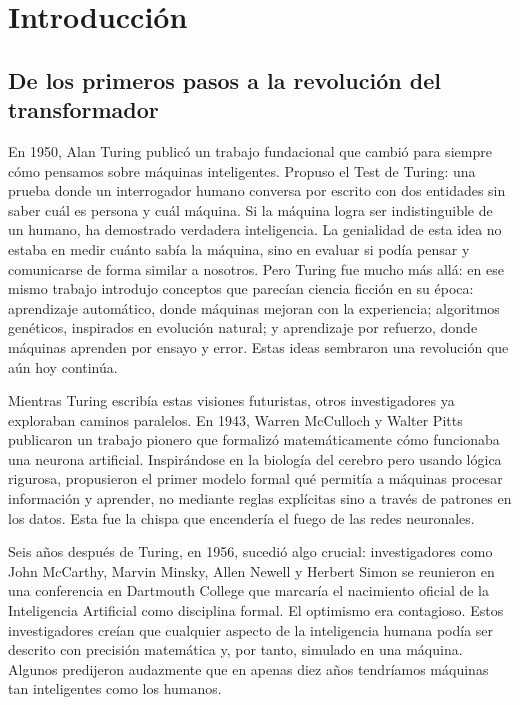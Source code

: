 \chapter{Introducción}
\label{cap:introduccion}

\section{De los primeros pasos a la revolución del transformador}

En 1950, Alan Turing publicó un trabajo fundacional que cambió para siempre cómo pensamos 
sobre máquinas inteligentes. Propuso el Test de Turing: una prueba donde un interrogador humano conversa por 
escrito con dos entidades sin saber cuál es persona y cuál máquina. Si la máquina logra ser indistinguible de un 
humano, ha demostrado verdadera inteligencia. La genialidad de esta idea no estaba en medir cuánto sabía la máquina,
sino en evaluar si podía pensar y comunicarse de forma similar a nosotros. Pero Turing fue mucho más allá: en ese 
mismo trabajo introdujo conceptos que parecían ciencia ficción en su época: aprendizaje automático, donde máquinas 
mejoran con la experiencia; algoritmos genéticos, inspirados en evolución natural; y 
aprendizaje por refuerzo, donde máquinas aprenden por ensayo y error. Estas ideas sembraron una revolución que 
aún hoy continúa.

Mientras Turing escribía estas visiones futuristas, otros investigadores ya exploraban 
caminos paralelos. En 1943, Warren McCulloch y Walter Pitts publicaron un trabajo pionero que formalizó 
matemáticamente cómo funcionaba una neurona artificial. Inspirándose en la biología del cerebro pero usando 
lógica rigurosa, propusieron el primer modelo formal qué permitía a máquinas procesar información y 
aprender, no mediante reglas explícitas sino a través de patrones en los datos. Esta fue la chispa que encendería 
el fuego de las redes neuronales.


Seis años después de Turing, en 1956, sucedió algo crucial: investigadores como John McCarthy, Marvin Minsky, 
Allen Newell y Herbert Simon se reunieron en una conferencia en Dartmouth College que marcaría el nacimiento 
oficial de la Inteligencia Artificial como disciplina formal. El optimismo era contagioso. Estos investigadores
creían que cualquier aspecto de la inteligencia humana podía ser descrito con precisión matemática y, por tanto, 
simulado en una máquina. Algunos predijeron audazmente que en apenas diez años tendríamos máquinas tan inteligentes
como los humanos. 

